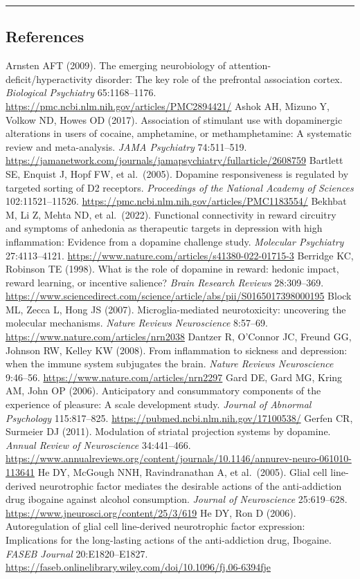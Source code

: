\begin{center}\rule{0.5\linewidth}{0.5pt}\end{center}

\subsection{References}\label{18_restoration-references}

Arnsten AFT (2009). The emerging neurobiology of attention-deficit/hyperactivity disorder: The key role of the prefrontal association cortex. \emph{Biological Psychiatry} 65:1168--1176. \url{https://pmc.ncbi.nlm.nih.gov/articles/PMC2894421/} Ashok AH, Mizuno Y, Volkow ND, Howes OD (2017). Association of stimulant use with dopaminergic alterations in users of cocaine, amphetamine, or methamphetamine: A systematic review and meta-analysis. \emph{JAMA Psychiatry} 74:511--519. \url{https://jamanetwork.com/journals/jamapsychiatry/fullarticle/2608759} Bartlett SE, Enquist J, Hopf FW, et al.~(2005). Dopamine responsiveness is regulated by targeted sorting of D2 receptors. \emph{Proceedings of the National Academy of Sciences} 102:11521--11526. \url{https://pmc.ncbi.nlm.nih.gov/articles/PMC1183554/} Bekhbat M, Li Z, Mehta ND, et al.~(2022). Functional connectivity in reward circuitry and symptoms of anhedonia as therapeutic targets in depression with high inflammation: Evidence from a dopamine challenge study. \emph{Molecular Psychiatry} 27:4113--4121. \url{https://www.nature.com/articles/s41380-022-01715-3} Berridge KC, Robinson TE (1998). What is the role of dopamine in reward: hedonic impact, reward learning, or incentive salience? \emph{Brain Research Reviews} 28:309--369. \url{https://www.sciencedirect.com/science/article/abs/pii/S0165017398000195} Block ML, Zecca L, Hong JS (2007). Microglia-mediated neurotoxicity: uncovering the molecular mechanisms. \emph{Nature Reviews Neuroscience} 8:57--69. \url{https://www.nature.com/articles/nrn2038} Dantzer R, O'Connor JC, Freund GG, Johnson RW, Kelley KW (2008). From inflammation to sickness and depression: when the immune system subjugates the brain. \emph{Nature Reviews Neuroscience} 9:46--56. \url{https://www.nature.com/articles/nrn2297} Gard DE, Gard MG, Kring AM, John OP (2006). Anticipatory and consummatory components of the experience of pleasure: A scale development study. \emph{Journal of Abnormal Psychology} 115:817--825. \url{https://pubmed.ncbi.nlm.nih.gov/17100538/} Gerfen CR, Surmeier DJ (2011). Modulation of striatal projection systems by dopamine. \emph{Annual Review of Neuroscience} 34:441--466. \url{https://www.annualreviews.org/content/journals/10.1146/annurev-neuro-061010-113641} He DY, McGough NNH, Ravindranathan A, et al.~(2005). Glial cell line-derived neurotrophic factor mediates the desirable actions of the anti-addiction drug ibogaine against alcohol consumption. \emph{Journal of Neuroscience} 25:619--628. \url{https://www.jneurosci.org/content/25/3/619} He DY, Ron D (2006). Autoregulation of glial cell line-derived neurotrophic factor expression: Implications for the long-lasting actions of the anti-addiction drug, Ibogaine. \emph{FASEB Journal} 20:E1820--E1827. \url{https://faseb.onlinelibrary.wiley.com/doi/10.1096/fj.06-6394fje} 